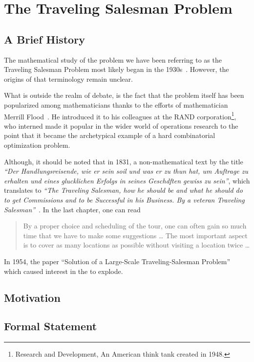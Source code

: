 \chapter{The Traveling Salesman Problem}

    \section{A Brief History}

    The mathematical study of the problem we have been referring to as the Traveling Salesman Problem most likely began in the 1930s~\cite{tsp-computational-solutions}. However, the origins of that terminology remain unclear.

    What is outside the realm of debate, is the fact that the problem itself has been popularized among mathematicians thanks to the efforts of mathematician Merrill Flood~\cite{tsp-computational-study}. He introduced it to his colleagues at the RAND corporation\footnote{Research and Development, An American think tank created in 1948.}, who interned made it popular in the wider world of operations research to the point that it became the archetypical example of a hard combinatorial optimization problem.

    Although, it should be noted that in 1831, a non-mathematical text by the title \emph{``Der Handlungsreisende, wie er sein soil und was er zu thun hat, um Auftrage zu erhalten und eines glucklichen Erfolgs in seines Geschdften gewiss zu sein''}, which translates to \emph{``The Traveling Salesman, how he should be and what he should do to get Commissions and to be Successful in his Business. By a veteran Traveling Salesman''}~\cite{tsp-tour,original}. In the last chapter, one can read 
    \begin{quote}
        By a proper choice and scheduling of the tour, one can often gain so much time that we have to make some suggestions \dots{} The most important aspect is to cover as many locations as possible without visiting a location twice \dots
    \end{quote}

    In 1954, the paper ``Solution of a Large-Scale Traveling-Salesman Problem''~\cite{large-scale} which caused interest in the \TSP{} to explode.

    \section{Motivation}

    \section{Formal Statement}